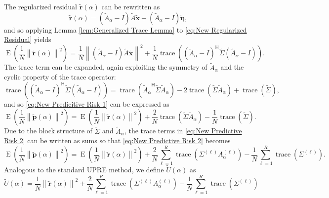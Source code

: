 \documentclass[12pt]{article}
\newcommand{\pVec}{\mathbf{p}}	%
\newcommand{\rVec}{\mathbf{r}}	%
\newcommand{\xVec}{\mathbf{x}}	%
\newcommand{\ctrans}[1]{{#1}^\mathsf{H}}	%
\DeclareMathOperator{\trace}{trace}		%
\newcommand{\regparam}{\alpha}
\newcommand{\noise}{\eta}	%
\newcommand{\noiseVec}{\bm{\noise}}	%
\DeclareMathOperator{\E}{E}	%
\newcommand{\U}{U}	%
\begin{document}
The regularized residual $\widetilde{\rVec}(\regparam)$ can be rewritten as
\begin{equation}
\label{eq:New Regularized Residual}
\widetilde{\rVec}(\regparam) = \left(\widetilde{A}_\regparam - I\right)\widetilde{A}\widetilde{\xVec} + \left(\widetilde{A}_\regparam - I\right)\widetilde{\noiseVec},
\end{equation}
and so applying Lemma \ref{lem:Generalized Trace Lemma} to \eqref{eq:New Regularized Residual} yields
\[\E\left(\frac{1}{N}\left\|\widetilde{\rVec}(\regparam)\right\|^2\right) = \frac{1}{N}\left\|\left(\widetilde{A}_\regparam - I\right)\widetilde{A}\widetilde{\xVec}\right\|^2 + \frac{1}{N}\trace\left(\ctrans{\left(\widetilde{A}_\regparam - I\right)}\widetilde{\Sigma}\left(\widetilde{A}_\regparam - I\right) \right).\]
The trace term can be expanded, again exploiting the symmetry of $\widetilde{A}_\regparam$ and the cyclic property of the trace operator:
\[\trace\left(\ctrans{\left(\widetilde{A}_\regparam - I\right)}\widetilde{\Sigma}\left(\widetilde{A}_\regparam - I\right) \right) = \trace\left(\ctrans{\widetilde{A}_\regparam}\widetilde{\Sigma}\widetilde{A}_\regparam\right) - 2\trace\left(\widetilde{\Sigma}\widetilde{A}_\regparam\right) + \trace\left( \widetilde{\Sigma}\right),\]
and so \eqref{eq:New Predicitive Risk 1} can be expressed as
\begin{equation}
\label{eq:New Predictive Risk 2}
\E\left(\frac{1}{N}\left\|\widetilde{\pVec}(\regparam)\right\|^2\right) = \E\left(\frac{1}{N}\left\|\widetilde{\rVec}(\regparam)\right\|^2\right) + \frac{2}{N}\trace\left(\widetilde{\Sigma}\widetilde{A}_\regparam\right) - \frac{1}{N}\trace\left(\widetilde{\Sigma}\right).
\end{equation}
Due to the block structure of $\widetilde{\Sigma}$ and $\widetilde{A}_\regparam$, the trace terms in \eqref{eq:New Predictive Risk 2} can be written as sums so that \eqref{eq:New Predictive Risk 2} becomes
\begin{equation}
\label{eq:New Predictive Risk 3}
\E\left(\frac{1}{N}\left\|\widetilde{\pVec}(\regparam)\right\|^2\right) = \E\left(\frac{1}{N}\left\|\widetilde{\rVec}(\regparam)\right\|^2\right) + \frac{2}{N} \sum_{\ell=1}^R \trace\left(\Sigma^{(\ell)} A_\regparam^{(\ell)}\right) - \frac{1}{N} \sum_{\ell=1}^R \trace\left(\Sigma^{(\ell)}\right).
\end{equation}
Analogous to the standard UPRE method, we define $\widetilde{\U}(\regparam)$ as
\begin{equation}
\label{eq:UPRE 2}
\widetilde{\U}(\regparam) = \frac{1}{N}\left\|\widetilde{\rVec}(\regparam)\right\|^2 + \frac{2}{N} \sum_{\ell=1}^R \trace\left(\Sigma^{(\ell)} A_\regparam^{(\ell)}\right) - \frac{1}{N} \sum_{\ell=1}^R \trace\left(\Sigma^{(\ell)}\right)
\end{equation}
\end{document}
